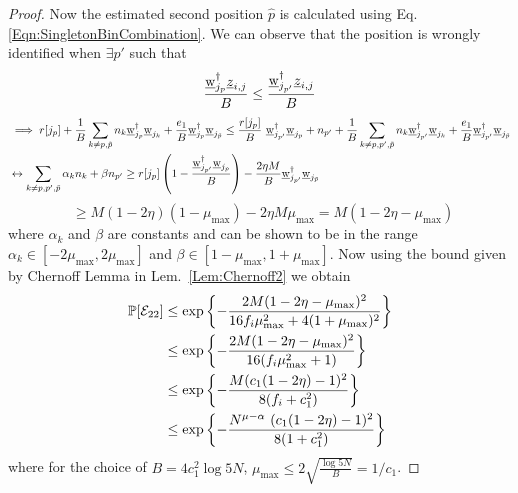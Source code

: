 \begin{proof}
Now the estimated second position $\hat{p}$ is calculated using Eq. \eqref{Eqn:SingletonBinCombination}. We can observe that the position is wrongly identified when $\exists p'$ such that
\[ \frac{\underline{\mathrm{w}}_{j_p}^{\dagger}\underline{z}_{i,j}}{B} \leq \frac{\underline{\mathrm{w}}_{j_{p'}}^{\dagger}\underline{z}_{i,j}}{B}\]
\begin{align*}
 &\implies r[j_p] + \frac{1}{B}\sum_{k \neq p, \tilde{p}} n_k 	\underline{\mathrm{w}}_{j_p}^{\dagger}\underline{\mathrm{w}}_{j_k} + \frac{e_1}{B} \underline{\mathrm{w}}_{j_p}^{\dagger}\underline{\mathrm{w}}_{j_{\tilde{p}}}  \leq \frac{r[j_p]}{B} ~ \underline{\mathrm{w}}_{j_{p'}}^{\dagger}\underline{\mathrm{w}}_{j_p}+ n_{p'}+\frac{1}{B}\sum_{k \neq p,p',\tilde{p}}n_k\underline{\mathrm{w}}_{j_{p'}}^{\dagger} \underline{\mathrm{w}}_{j_k} + \frac{e_1}{B} \underline{\mathrm{w}}_{j_{p'}}^{\dagger}\underline{\mathrm{w}}_{j_{\tilde{p}}}\\
&\leftrightarrow \sum_{k \neq p,p',\tilde{p}}\alpha_k n_k+ \beta n_{p'}  \geq  r[j_p]\left(1-\frac{\underline{\mathrm{w}}_{j_{p'}}^{\dagger}\underline{\mathrm{w}}_{j_p}}{B}\right) - \frac{2 \eta M}{B} \underline{\mathrm{w}}_{j_{p'}}^{\dagger}\underline{\mathrm{w}}_{j_{\tilde{p}}}
\end{align*}
\[~~\geq M(1-2\eta)(1-\mu_{\text{max}}) - 2 \eta M \mu_{\text{max}} = M(1 - 2\eta - \mu_{\text{max}})                         
\]
where $\alpha_k$ and $\beta$ are constants and can be shown to be in the range $\alpha_k\in[-2\mu_\text{max},2\mu_\text{max}]$ and $\beta\in[1-\mu_\text{max},1+\mu_\text{max}]$. Now using the bound given by Chernoff Lemma in Lem.~\ref{Lem:Chernoff2} we obtain
\begin{align*}
\mathbb{P}[\mathcal{E}_{22}]&\leq \exp\left\lbrace-\frac{2M(1 - 2\eta - \mu_{\text{max}})^2}{16f_i\mu^2_{\max}+4(1+\mu_{\max})^2}\right\rbrace\\
&\leq\exp\left\lbrace-\frac{2M(1 - 2\eta - \mu_{\text{max}})^2}{16(f_i\mu^2_{\max}+1)}\right\rbrace\\
&\leq\exp\left\lbrace-\frac{M(c_1(1 - 2\eta) - 1)^2}{8(f_i+c_1^2)}\right\rbrace\\
&\leq\exp\left\lbrace-\frac{N^{\mu - \alpha} ~ (c_1(1 - 2\eta) - 1)^2}{8(1+ c_1^2)}\right\rbrace\\
\end{align*}
where for the choice of $B=4c_1^2\log 5N$, $\mu_{\max}\leq 2\sqrt{\frac{\log 5N}{B}} = 1/c_1$.

\end{proof}

